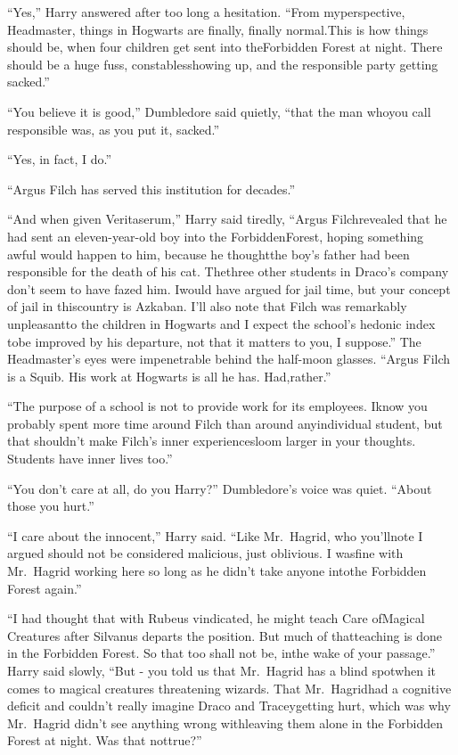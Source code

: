``Yes,'' Harry answered after too long a hesitation. ``From myperspective, Headmaster, things in Hogwarts are finally, finally normal.This is how things should be, when four children get sent into theForbidden Forest at night. There should be a huge fuss, constablesshowing up, and the responsible party getting sacked.''

``You believe it is good,'' Dumbledore said quietly, ``that the man whoyou call responsible was, as you put it, sacked.''

``Yes, in fact, I do.''

``Argus Filch has served this institution for decades.''

``And when given Veritaserum,'' Harry said tiredly, ``Argus Filchrevealed that he had sent an eleven-year-old boy into the ForbiddenForest, hoping something awful would happen to him, because he thoughtthe boy's father had been responsible for the death of his cat. Thethree other students in Draco's company don't seem to have fazed him. Iwould have argued for jail time, but your concept of jail in thiscountry is Azkaban. I'll also note that Filch was remarkably unpleasantto the children in Hogwarts and I expect the school's hedonic index tobe improved by his departure, not that it matters to you, I suppose.''
The Headmaster's eyes were impenetrable behind the half-moon glasses.
``Argus Filch is a Squib. His work at Hogwarts is all he has. Had,rather.''

``The purpose of a school is not to provide work for its employees. Iknow you probably spent more time around Filch than around anyindividual student, but that shouldn't make Filch's inner experiencesloom larger in your thoughts. Students have inner lives too.''

``You don't care at all, do you Harry?'' Dumbledore's voice was quiet.
``About those you hurt.''

``I care about the innocent,'' Harry said. ``Like Mr.~Hagrid, who you'llnote I argued should not be considered malicious, just oblivious. I wasfine with Mr.~Hagrid working here so long as he didn't take anyone intothe Forbidden Forest again.''

``I had thought that with Rubeus vindicated, he might teach Care ofMagical Creatures after Silvanus departs the position. But much of thatteaching is done in the Forbidden Forest. So that too shall not be, inthe wake of your passage.''
Harry said slowly, ``But - you told us that Mr.~Hagrid has a blind spotwhen it comes to magical creatures threatening wizards. That Mr.~Hagridhad a cognitive deficit and couldn't really imagine Draco and Traceygetting hurt, which was why Mr.~Hagrid didn't see anything wrong withleaving them alone in the Forbidden Forest at night. Was that nottrue?''

